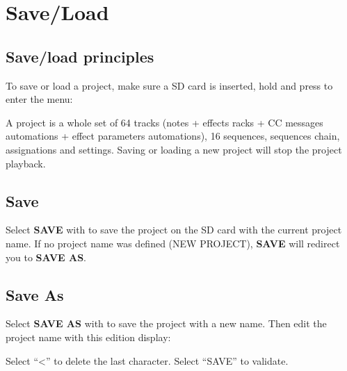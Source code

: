 \chapter{Save/Load}

\section{Save/load principles}

To save or load a project, make sure a SD card is inserted, hold  and press  to enter the menu:


A project is a whole set of 64 tracks (notes + effects racks + CC messages automations + effect parameters automations), 16 sequences, sequences chain, assignations and settings. Saving or loading a new project will stop the project playback.




\section{Save}

Select \textbf{SAVE} with \encodericon{} to save the project on the SD card with the current project name. If no project name was defined (NEW PROJECT), \textbf{SAVE} will redirect you to \textbf{SAVE AS}.



\section{Save As}

Select \textbf{SAVE AS} with \encodericon{} to save the project with a new name. Then edit the project name with this edition display:


Select ``<'' to delete the last character.
Select ``SAVE'' to validate.

